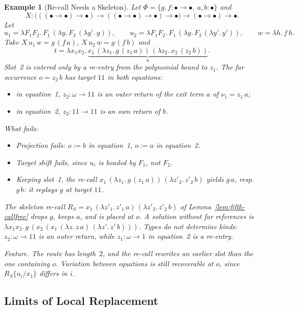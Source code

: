 \documentclass[10pt,a4paper]{article}
\theoremstyle{plain}%
\newtheorem{example}[theorem]{Example}
\begin{document}
\begin{example}[Re-call Needs a Skeleton]\label{ex:ex-skeleton}
Let $\Phi = \{g,f : \bullet\to\bullet,\ a,b : \bullet\}$ and
\[
X : \big(((\bullet\to\bullet)\to\bullet) \to ((\bullet\to\bullet)\to\bullet) \to \bullet\big) \to (\bullet\to\bullet) \to \bullet .
\]
Let
\[
u_1 = \lambda F_1F_2.\,F_1\,(\lambda y.\,F_2\,(\lambda y'.\,y)),
\qquad
u_2 = \lambda F_1F_2.\,F_1\,(\lambda y.\,F_2\,(\lambda y'.\,y')),
\qquad
w = \lambda h.\,f\,h .
\]
Take $X\,u_1\,w = g\,(f\,a)$, $X\,u_2\,w = g\,(f\,b)$ and
\[
t = \lambda x_1x_2.\,\underbrace{x_1\,(\lambda z_1.\,g\,(z_1\,a))\,(\lambda z_2.\,x_2\,(z_2\,b))}_{n}.
\]
Slot~2 is entered only by a re-entry from the polynomial bound to $z_1$.
The far occurrence $o = z_2\,b$ has target $11$ in both equations:
\begin{itemize}
\item in equation~1, $z_2 : \omega \to 11$ is an outer return of the exit term $a$ of $\nu_1 = z_1\,a$;
\item in equation~2, $z_2 : 11 \to 11$ is an own return of $b$.
\end{itemize}
What fails:
\begin{itemize}
\item Projection fails: $o := b$ in equation~1, $o := a$ in equation~2.
\item Target shift fails, since $u_i$ is headed by $F_1$, not $F_2$.
\item Keeping slot~1, the re-call $x_1\,(\lambda z_1.\,g\,(z_1\,a))\,(\lambda z'_2.\,z'_2\,b)$ yields $g\,a$, resp.\ $g\,b$: it replays $g$ at target $11$.
\end{itemize}
The skeleton re-call $R_S = x_1\,(\lambda z'_1.\,z'_1\,a)\,(\lambda z'_2.\,z'_2\,b)$ of Lemma~\ref{lem:fifth-callfree} drops $g$, keeps $a$, and is placed at $o$.
A solution without far references is $\lambda x_1x_2.\,g\,(x_2\,(x_1\,(\lambda z.\,z\,a)\,(\lambda z'.\,z'\,b)))$.
Types do not determine kinds: $z_2 : \omega \to 11$ is an outer return, while $z_1 : \omega \to 1$ in equation~2 is a re-entry.

\emph{Feature.}
The route has length~$2$, and the re-call rewrites an earlier slot than the one containing $o$.
Variation between equations is still recoverable at $o$, since $R_S\{u_i/x_1\}$ differs in $i$.
\end{example}

\subsection{Limits of Local Replacement}
\end{document}
